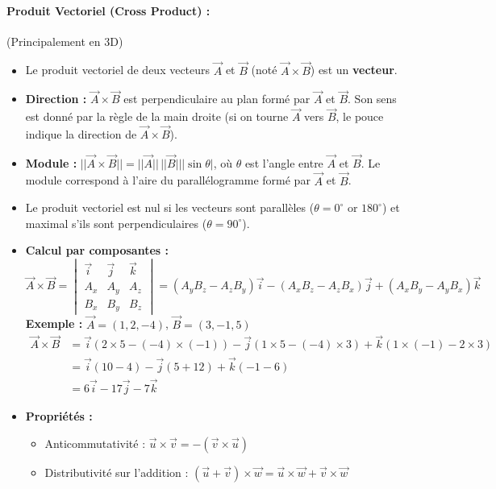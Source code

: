 \documentclass{article}
\begin{document}
\paragraph{Produit Vectoriel (Cross Product) :} (Principalement en 3D)
\begin{itemize}
    \item Le produit vectoriel de deux vecteurs $\vec{A}$ et $\vec{B}$ (noté $\vec{A} \times \vec{B}$) est un \textbf{vecteur}.
    \item \textbf{Direction :} $\vec{A} \times \vec{B}$ est perpendiculaire au plan formé par $\vec{A}$ et $\vec{B}$. Son sens est donné par la règle de la main droite (si on tourne $\vec{A}$ vers $\vec{B}$, le pouce indique la direction de $\vec{A} \times \vec{B}$).
    \item \textbf{Module :} $||\vec{A} \times \vec{B}|| = ||\vec{A}|| \, ||\vec{B}|| |\sin \theta|$, où $\theta$ est l'angle entre $\vec{A}$ et $\vec{B}$. Le module correspond à l'aire du parallélogramme formé par $\vec{A}$ et $\vec{B}$.
    \item Le produit vectoriel est nul si les vecteurs sont parallèles ($\theta=0^\circ$ or $180^\circ$) et maximal s'ils sont perpendiculaires ($\theta=90^\circ$).
    \item \textbf{Calcul par composantes :}
    \[ \vec{A} \times \vec{B} =
    \begin{vmatrix}
    \vec{i} & \vec{j} & \vec{k} \\
    A_x & A_y & A_z \\
    B_x & B_y & B_z
    \end{vmatrix}
    = (A_y B_z - A_z B_y)\vec{i} - (A_x B_z - A_z B_x)\vec{j} + (A_x B_y - A_y B_x)\vec{k}
    \]
    \textbf{Exemple :} $\vec{A}=(1, 2, -4)$, $\vec{B}=(3, -1, 5)$
    \begin{align*} \vec{A} \times \vec{B} &= \vec{i} (2 \times 5 - (-4) \times (-1)) - \vec{j} (1 \times 5 - (-4) \times 3) + \vec{k} (1 \times (-1) - 2 \times 3) \\ &= \vec{i} (10 - 4) - \vec{j} (5 + 12) + \vec{k} (-1 - 6) \\ &= 6\vec{i} - 17\vec{j} - 7\vec{k} \end{align*}
    \item \textbf{Propriétés :}
    \begin{itemize}
        \item Anticommutativité : $\vec{u} \times \vec{v} = -(\vec{v} \times \vec{u})$
        \item Distributivité sur l'addition : $(\vec{u} + \vec{v}) \times \vec{w} = \vec{u} \times \vec{w} + \vec{v} \times \vec{w}$

\end{itemize}
\end{itemize}
\end{document}
